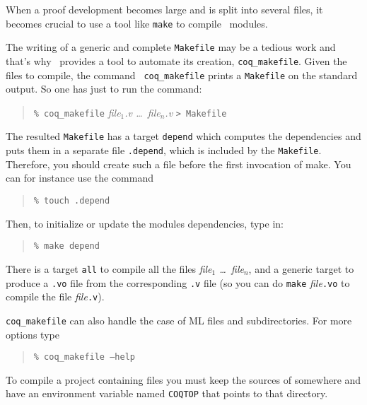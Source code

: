 When a proof development becomes large and is split into several files,
it becomes crucial to use a tool like {\tt make} to compile \Coq\
modules.

The writing of a generic and complete {\tt Makefile} may be a tedious work
and that's why \Coq\ provides a tool to automate its creation,
{\tt coq\_makefile}. Given the files to compile, the command {\tt
coq\_makefile} prints a 
{\tt Makefile} on the standard output. So one has just to run the
command:

\begin{quotation}
\texttt{\% coq\_makefile} {\em file$_1$.v \dots\ file$_n$.v} \texttt{> Makefile}
\end{quotation}

The resulted {\tt Makefile} has a target {\tt depend} which computes the
dependencies and puts them in a separate file {\tt .depend}, which is
included by the {\tt Makefile}. 
Therefore, you should create such a file before the first invocation
of make. You can for instance use the command 

\begin{quotation}
\texttt{\% touch .depend}
\end{quotation}

Then, to initialize or update the modules dependencies, type in:

\begin{quotation}
\texttt{\% make depend}
\end{quotation}

There is a target {\tt all} to compile all the files {\em file$_1$
\dots\ file$_n$}, and a generic target to produce a {\tt .vo} file from
the corresponding {\tt .v} file (so you can do {\tt make} {\em file}{\tt.vo}
to compile the file {\em file}{\tt.v}).

{\tt coq\_makefile} can also handle the case of ML files and
subdirectories. For more options type

\begin{quotation}
\texttt{\% coq\_makefile --help}
\end{quotation}

\Warning To compile a project containing \ocaml{} files you must keep
the sources of \Coq{} somewhere and have an environment variable named
\texttt{COQTOP} that points to that directory.



